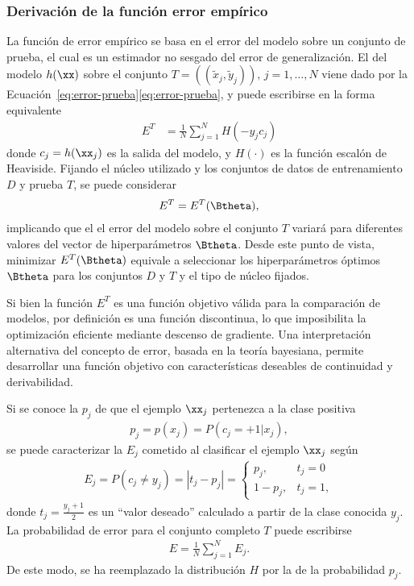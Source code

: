%
\subsubsection{Derivación de la función error empírico}
%
La función de error empírico se basa en el error del modelo sobre un
conjunto de prueba, el cual es un estimador no
sesgado del error de generalización.  El  del
modelo $h(\xx)$ sobre el conjunto
$T=((\tilde{x}_j,\tilde{y}_j)),\,j=1,\ldots,N$ viene dado por
la \iflatexml{}Ecuación~\ref{eq:error-prueba}\else\autoref{eq:error-prueba}\fi,
y puede escribirse en la forma equivalente
%
\begin{align}
\label{e3:error-test-alt}
  E^T &= \frac{1}{N}\sum_{j=1}^{N} H(-{y}_j {c}_j)
\end{align}
%
donde $c_j=h(\xx_j)$ es la salida del modelo, y
$H(\cdot)$ es la función escalón de Heaviside. Fijando el núcleo
utilizado y los conjuntos de datos de entrenamiento $D$ y prueba $T$, se
puede considerar
%
\begin{align}
\label{e3:error-test-func-theta}
  E^T = E^T(\Btheta),
\end{align}
%
implicando que el el error del modelo sobre el conjunto $T$ variará
para diferentes valores del vector de hiperparámetros $\Btheta$.
Desde este punto de vista, minimizar $E^T(\Btheta)$ equivale a
seleccionar los hiperparámetros óptimos $\Btheta$ para los conjuntos
$D$ y $T$ y el tipo de núcleo fijados.

Si bien la función $E^T$ es una función objetivo válida para la
comparación de modelos, por definición es una función discontinua, lo
que imposibilita la optimización eficiente mediante descenso de
gradiente. Una interpretación alternativa del concepto de error,
basada en la teoría bayesiana, permite desarrollar una función
objetivo con características deseables de continuidad y derivabilidad.

Si se conoce la  $p_j$ de que el ejemplo
$\xx_j$ pertenezca a la clase positiva
%
\begin{align}
  \label{e3:pk}
  p_j = p(x_j) = P(c_j=+1|x_j),
\end{align}
%
se puede caracterizar la  $E_j$ cometido al
clasificar el ejemplo $\xx_j$ según
%
\begin{align}
\label{e3:Ek}
  E_j = P(c_j\neq y_j) = |t_j-{p}_j| =
  \begin{cases}
    {p}_j, & t_j=0\\ 1-{p}_j, & t_j = 1,
  \end{cases}
\end{align}
%
donde $t_j=\frac{y_j+1}{2}$ es un ``valor deseado'' calculado a partir
de la clase conocida $y_j$. La probabilidad de error para el conjunto
completo $T$ puede escribirse
%
\begin{align}
\label{Err1}
  E = \frac{1}{N}\sum_{j=1}^{N} E_j.
\end{align}
%
De este modo, se ha reemplazado la distribución $H$ por la de la probabilidad
$p_j$.

